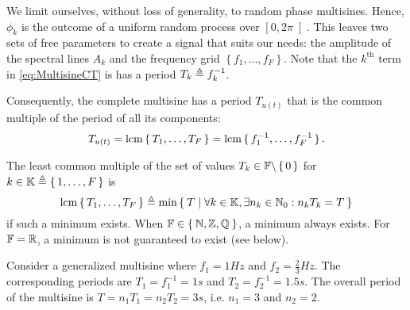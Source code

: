   We limit ourselves, without loss of generality, to random phase multisines.
  Hence, $\phi_k$ is the outcome of a uniform random process over $\left[0,2\pi\right[$.
  This leaves two sets of free parameters to create a signal that suits our needs:
    the amplitude of the spectral lines $A_k$ and
    the frequency grid $\left\{f_1, \ldots, f_F \right\}$.
  Note that the $k^{\text{th}}$ term in \eqref{eq:MultisineCT} is has a period $T_k \triangleq f_k^{-1}$.

  Consequently, the complete multisine has a period $T_{u(t)}$ that is the common multiple of the period of all its components:
  \begin{equation}
    T_{u(t)}  = \operatorname{lcm} \set{T_1, \ldots, T_F}
      = \operatorname{lcm} \set{f_1^{-1}, \ldots, f_F^{-1}}
    \text{.}
  \end{equation}
  \begin{definition} \label{def:lcm-real}
  The least common multiple of the set of values $T_k \in \mathbb{F}\backslash\set{0}$ for $k \in \mathbb{K} \triangleq \set{1, \ldots, F}$ is  
  \begin{equation}
    \operatorname{lcm} \set{T_1, \ldots, T_F} \triangleq
      \min \Set{T |\forall k \in \mathbb{K}, \exists n_k \in \ensuremath{\mathbb{N}_{0}}: n_k T_k = T }
   \end{equation}
   if such a minimum exists.
   When $\mathbb{F} \in \Set{\ensuremath{\mathbb{N}}, \ensuremath{\mathbb{Z}}, \ensuremath{\mathbb{Q}}}$, a minimum always exists.
   For $\mathbb{F} = \mathbb{R}$, a minimum is not guaranteed to exist (see below).
   \end{definition}
  \begin{example}
   Consider a generalized multisine where $f_1 = 1 \unit{Hz}$ and $f_2 = \tfrac{2}{3} \unit{Hz}$.
   The corresponding periods are $T_1 = f_1^{-1} = 1 \unit{s}$ and $T_2 = f_2^{-1} = 1.5 \unit{s}$.
   The overall period of the multisine is $T = n_1 T_1 = n_2 T_2 = 3 \unit{s}$, i.e. $n_1 = 3$ and $n_2=2$.
  \end{example}

